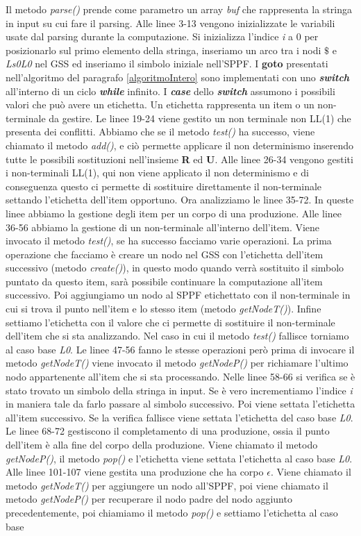 Il metodo \textit{parse()} prende come parametro un array \textit{buf} che rappresenta la stringa in input su cui fare il parsing. Alle linee 3-13 vengono inizializzate le variabili usate dal parsing durante la computazione. Si inizializza l'indice \textit{i} a 0 per posizionarlo sul primo elemento della stringa, inseriamo un arco tra i nodi $\$$ e \textit{Ls0L0} nel GSS ed inseriamo il simbolo iniziale nell'SPPF. I \textbf{goto} presentati nell'algoritmo del paragrafo \ref{algoritmoIntero} sono implementati con uno \textbf{\textit{switch }}all'interno di un ciclo \textbf{\textit{while}} infinito. I \textbf{\textit{case}} dello \textbf{\textit{switch}} assumono i possibili valori che può avere un etichetta. Un etichetta rappresenta un item o un non-terminale da gestire. Le linee 19-24 viene gestito un non terminale non LL(1) che presenta dei conflitti. Abbiamo che se il metodo \textit{test()} ha successo, viene chiamato il metodo \textit{add()}, e ciò permette applicare il non determinismo inserendo tutte le possibili sostituzioni nell'insieme \textbf{R} ed \textbf{U}. Alle linee 26-34 vengono gestiti i non-terminali LL(1), qui non viene applicato il non determinismo e di conseguenza questo ci permette di sostituire direttamente il non-terminale settando l'etichetta dell'item opportuno. Ora analizziamo le linee 35-72. In queste linee abbiamo la gestione degli item per un corpo di una produzione. Alle linee 36-56 abbiamo la gestione di un non-terminale all'interno dell'item. Viene invocato il metodo \textit{test()}, se ha successo facciamo varie operazioni. La prima operazione che facciamo è creare un nodo nel GSS con l'etichetta dell'item successivo (metodo \textit{create()}), in questo modo quando verrà sostituito il simbolo puntato da questo item, sarà possibile continuare la computazione all'item successivo. Poi aggiungiamo un nodo al SPPF etichettato con il non-terminale in cui si trova il punto nell'item e lo stesso item (metodo \textit{getNodeT()}). Infine settiamo l'etichetta con il valore che ci permette di sostituire il non-terminale dell'item che si sta analizzando. Nel caso in cui il metodo \textit{test()} fallisce torniamo al caso base \textit{L0}. Le linee 47-56 fanno le stesse operazioni però prima di invocare il metodo \textit{getNodeT()} viene invocato il metodo \textit{getNodeP()} per richiamare l'ultimo nodo appartenente all'item che si sta processando. Nelle linee 58-66 si verifica se è stato trovato un simbolo della stringa in input. Se è vero incrementiamo l'indice \textit{i} in maniera tale da farlo passare al simbolo successivo. Poi viene settata l'etichetta all'item successivo. Se la verifica fallisce viene settata l'etichetta del caso base \textit{L0}. Le linee 68-72 gestiscono il completamento di una produzione, ossia il punto dell'item è alla fine del corpo della produzione. Viene chiamato il metodo \textit{getNodeP()}, il metodo \textit{pop()} e l'etichetta viene settata l'etichetta al caso base \textit{L0}. Alle linee 101-107 viene gestita una produzione che ha corpo $\epsilon$. Viene chiamato il metodo \textit{getNodeT()} per aggiungere un nodo all'SPPF, poi viene chiamato il metodo \textit{getNodeP()} per recuperare il nodo padre del nodo aggiunto precedentemente, poi chiamiamo il metodo \textit{pop()} e settiamo l'etichetta al caso base 